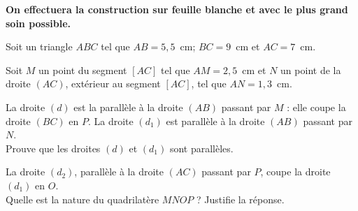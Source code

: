 {\bf On effectuera la construction sur feuille blanche et avec le plus
grand soin possible.}
\begin{myenumerate}
\item Soit un triangle $ABC$ tel que $AB=5,5$~cm; $BC=9$~cm et
$AC=7$~cm.
\item Soit $M$ un point du segment $[AC]$ tel que $AM=2,5$~cm et $N$
un point de la droite $(AC)$, extérieur au segment $[AC]$, tel que
$AN=1,3$~cm.
\item La droite $(d)$ est la parallèle à la droite $(AB)$ passant par
$M$ : elle coupe la droite $(BC)$ en $P$. La droite $(d_1)$ est
parallèle à la droite $(AB)$ passant par $N$.\\Prouve que les droites
$(d)$ et $(d_1)$ sont parallèles.
\item La droite $(d_2)$, parallèle à la droite $(AC)$ passant par $P$,
coupe la droite $(d_1)$ en $O$.\\Quelle est la nature du quadrilatère
$MNOP$ ? Justifie la réponse.
\end{myenumerate}